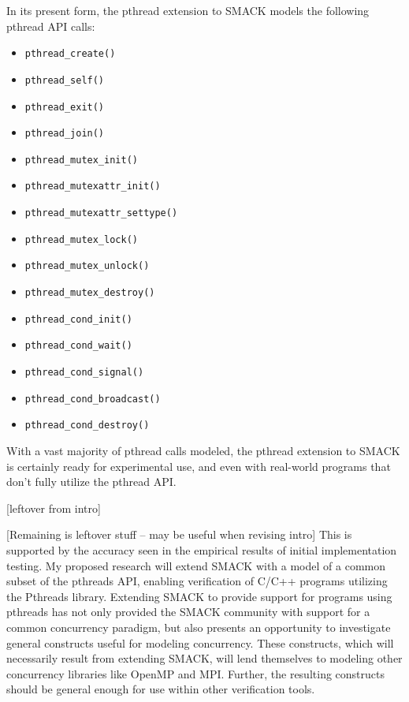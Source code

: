 In its present form, the pthread extension to SMACK models the
following pthread API calls:

\begin{itemize}
\item \lstinline|pthread_create()|
\item \lstinline|pthread_self()|
\item \lstinline|pthread_exit()|
\item \lstinline|pthread_join()|
\item \lstinline|pthread_mutex_init()|
\item \lstinline|pthread_mutexattr_init()|
\item \lstinline|pthread_mutexattr_settype()|
\item \lstinline|pthread_mutex_lock()|
\item \lstinline|pthread_mutex_unlock()|
\item \lstinline|pthread_mutex_destroy()|
\item \lstinline|pthread_cond_init()|
\item \lstinline|pthread_cond_wait()|
\item \lstinline|pthread_cond_signal()|
\item \lstinline|pthread_cond_broadcast()|
\item \lstinline|pthread_cond_destroy()|
\end{itemize}

With a vast majority of pthread calls modeled, the pthread extension
to SMACK is certainly ready for experimental use, and even with
real-world programs that don't fully utilize the pthread API.




[leftover from intro]


[Remaining is leftover stuff -- may be useful when revising intro]
This is supported by the accuracy seen in the empirical results of
initial implementation testing.  My proposed research will extend
SMACK with a model of a common subset of the pthreads API, enabling
verification of C/C++ programs utilizing the Pthreads library.
Extending SMACK to provide support for programs using pthreads has not
only provided the SMACK community with support for a common
concurrency paradigm, but also presents an opportunity to investigate
general constructs useful for modeling concurrency.  These constructs,
which will necessarily result from extending SMACK, will lend
themselves to modeling other concurrency libraries like OpenMP and
MPI.  Further, the resulting constructs should be general enough for
use within other verification tools. 

